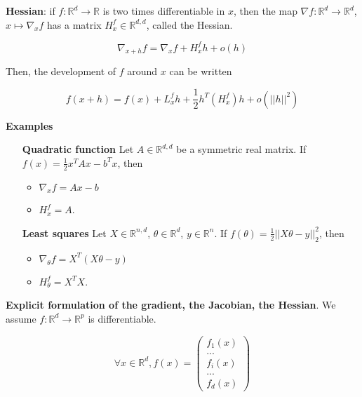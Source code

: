 \documentclass[
10pt, %
a4paper, %
oneside, %
headinclude,footinclude, %
BCOR5mm, %
]{scrartcl}
\begin{document}
\textbf{{Hessian}}: if $f: \mathbb{R}^d\rightarrow \mathbb{R} $ is two times differentiable in $x$, then the map $\nabla f: \mathbb{R}^d\rightarrow \mathbb{R}^d$, $x\mapsto\nabla_xf$ has a matrix $H^f_x\in \mathbb{R}^{d,d}$, called the Hessian.

\begin{equation*}
    \nabla_{x+h}f=\nabla_xf+H^f_xh+o(h)
\end{equation*}

Then, the development of $f$ around $x$ can be written

\begin{equation*}
    f(x+h)=f(x)+L^f_xh+ \frac{1}{2} h^T(H^f_x)h+o(||h||^2)
\end{equation*}

\textbf{{Examples}} 

\begin{itemize}
    \item[ \textbf{{Quadratic function}}] Let $A\in \mathbb{R}^{d,d}$ be a symmetric real matrix. If $f(x)= \frac{1}{2} x^TAx-b^Tx$, then
	\begin{itemize}
	    \item $\nabla_xf=Ax-b$ 
	    \item $H_x^f=A$.
	\end{itemize}
    \item[ \textbf{{Least squares}} ] Let $X\in \mathbb{R}^{n,d}$, $\theta\in \mathbb{R}^d$, $y\in \mathbb{R}^n$. If $f(\theta)= \frac{1}{2} ||X\theta-y||_2^2$, then
	\begin{itemize}
	    \item $\nabla_{\theta}f=X^T(X\theta-y)$
	    \item $H_{\theta}^f=X^TX$.
	\end{itemize}
\end{itemize}

\textbf{{Explicit formulation of the gradient, the Jacobian, the Hessian}}. We assume $f: \mathbb{R}^d\rightarrow  \mathbb{R}^p $ is differentiable.

\begin{equation*}
    \forall x\in \mathbb{R}^d, f(x)=
\begin{pmatrix}
    f_1(x)\\
...\\
    f_{i}(x)\\
...\\
    f_{d}(x)
\end{pmatrix}
\end{equation*}
\end{document}
